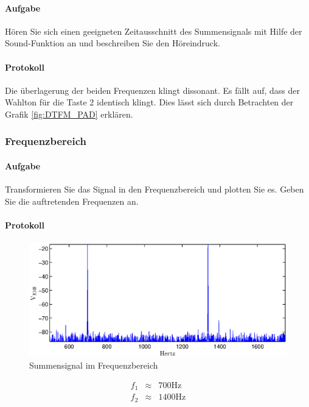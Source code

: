 \documentclass[10pt]{report}
\begin{document}
        \paragraph{Aufgabe}
        Hören Sie sich einen geeigneten Zeitausschnitt des Summensignals mit Hilfe der
        \glqq{}Sound\grqq{}-Funktion an und beschreiben Sie den Höreindruck.
        \paragraph{Protokoll}
        Die überlagerung der beiden Frequenzen klingt dissonant. Es fällt auf, dass
        der Wahlton für die Taste 2 identisch klingt. Dies lässt sich durch
        Betrachten der Grafik \ref{fig:DTFM_PAD} erklären.


        \subsubsection{Frequenzbereich}
        \paragraph{Aufgabe}
        Transformieren Sie das Signal in den Frequenzbereich und plotten Sie es. Geben Sie
        die auftretenden Frequenzen an.
        \paragraph{Protokoll}
        \begin{center}
            \begin{figure}[H]
                \includegraphics[width=\textwidth]{Screenshot_GUI_4204_beser}
              \caption{Summensignal im Frequenzbereich}
            \end{figure}
        \end{center}
        \begin{eqnarray*}
            f_1 &\approx& 700\si{\hertz}\\
            f_2 &\approx& 1400\si{\hertz}
        \end{eqnarray*}
\end{document}
